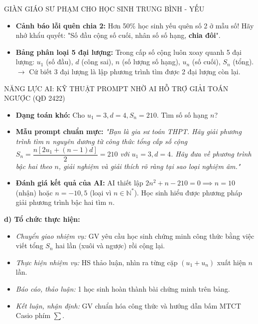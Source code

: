 \documentclass[12pt, a4paper]{article}
\begin{document}
\begin{scaffoldbox}{GIÀN GIÁO SƯ PHẠM CHO HỌC SINH TRUNG BÌNH - YẾU}  
\begin{itemize}[leftmargin=0.6cm]  
    \item \textbf{Cảnh báo lỗi quên chia 2:} Hơn 50\% học sinh yếu quên số 2 ở mẫu số! Hãy nhớ khẩu quyết: "Số đầu cộng số cuối, nhân số số hạng, \textbf{chia đôi}".  
    \item \textbf{Bảng phân loại 5 đại lượng:} Trong cấp số cộng luôn xoay quanh 5 đại lượng: $u_1$ (số đầu), $d$ (công sai), $n$ (số lượng số hạng), $u_n$ (số cuối), $S_n$ (tổng).  
    $\to$ Cứ biết 3 đại lượng là lập phương trình tìm được 2 đại lượng còn lại.  
\end{itemize}  
\end{scaffoldbox}  
  
\begin{aibox}{NĂNG LỰC AI: KỸ THUẬT PROMPT NHỜ AI HỖ TRỢ GIẢI TOÁN NGƯỢC (QĐ 2422)}  
\begin{itemize}[leftmargin=0.6cm]  
    \item \textbf{Dạng toán khó:} Cho $u_1 = 3, d = 4, S_n = 210$. Tìm số số hạng $n$?  
    \item \textbf{Mẫu prompt chuẩn mực:}  
    \textit{"Bạn là gia sư toán THPT. Hãy giải phương trình tìm $n$ nguyên dương từ công thức tổng cấp số cộng $S_n = \dfrac{n[2u_1 + (n - 1)d]}{2} = 210$ với $u_1 = 3, d = 4$. Hãy đưa về phương trình bậc hai theo $n$, giải nghiệm và giải thích rõ ràng tại sao loại nghiệm âm."}  
    \item \textbf{Đánh giá kết quả của AI:} AI thiết lập $2n^2 + n - 210 = 0 \implies n = 10$ (nhận) hoặc $n = -10{,}5$ (loại vì $n \in \mathbb{N}^*$). Học sinh hiểu được phương pháp giải phương trình bậc hai tìm $n$.  
\end{itemize}  
\end{aibox}  
  
\noindent \textbf{d) Tổ chức thực hiện:}  
\begin{itemize}[leftmargin=0.8cm]  
    \item \textit{Chuyển giao nhiệm vụ:} GV yêu cầu học sinh chứng minh công thức bằng việc viết tổng $S_n$ hai lần (xuôi và ngược) rồi cộng lại.  
    \item \textit{Thực hiện nhiệm vụ:} HS thảo luận, nhìn ra từng cặp $(u_1+u_n)$ xuất hiện $n$ lần.  
    \item \textit{Báo cáo, thảo luận:} 1 học sinh hoàn thành bài chứng minh trên bảng.  
    \item \textit{Kết luận, nhận định:} GV chuẩn hóa công thức và hướng dẫn bấm MTCT Casio phím $\sum$.  
\end{itemize}  
  
\end{document}
